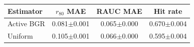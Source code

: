 \begin{tabular}{lccc}
\hline
Estimator & $r_{80}$ MAE & RAUC MAE & Hit rate \\
\hline
Active BGR & 0.081$\pm$0.001 & 0.065$\pm$0.000 & 0.670$\pm$0.004 \\
Uniform & 0.105$\pm$0.001 & 0.066$\pm$0.000 & 0.595$\pm$0.004 \\
\hline
\end{tabular}

